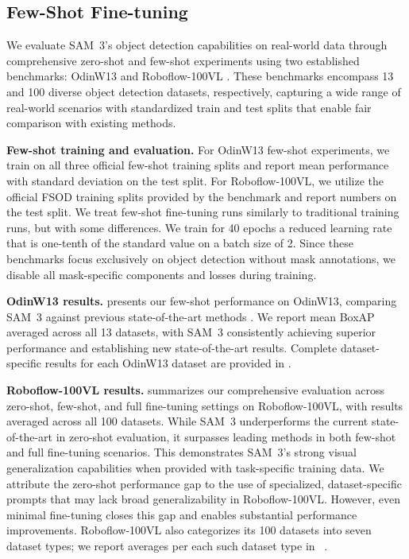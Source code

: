 \documentclass[]{fairmeta}
\newcommand{\model}{SAM~3\xspace}
\begin{document}
	
	
	
	
	\subsection{Few-Shot Fine-tuning}
	\label{app:fewshots}
	
	We evaluate \model's object detection capabilities on real-world data through comprehensive zero-shot and few-shot experiments using two established benchmarks: OdinW13 \cite{odinw} and Roboflow-100VL \cite{robicheaux2025roboflow100vl}. These benchmarks encompass 13 and 100 diverse object detection datasets, respectively, capturing a wide range of real-world scenarios with standardized train and test splits that enable fair comparison with existing methods.
	
	\textbf{Few-shot training and evaluation.} For OdinW13 few-shot experiments, we train on all three official few-shot training splits and report mean performance with standard deviation on the test split. For Roboflow-100VL, we utilize the official FSOD training splits provided by the benchmark and report numbers on the test split. We treat few-shot fine-tuning runs similarly to traditional training runs, but with some differences. We train for 40 epochs a reduced learning rate that is one-tenth of the standard value on a batch size of 2. Since these benchmarks focus exclusively on object detection without mask annotations, we disable all mask-specific components and losses during training.
	
	\textbf{OdinW13 results.}  presents our few-shot performance on OdinW13, comparing \model against previous state-of-the-art methods \cite{ren2024grounding, wu2023GLEE, xu2023multi, zhang2022glipv2}. We report mean BoxAP averaged across all 13 datasets, with \model consistently achieving superior performance and establishing new state-of-the-art results. Complete dataset-specific results for each OdinW13 dataset are provided in .
	
	\textbf{Roboflow-100VL results.}  summarizes our comprehensive evaluation across zero-shot, few-shot, and full fine-tuning settings on Roboflow-100VL, with results averaged across all 100 datasets. While \model underperforms the current state-of-the-art \cite{Liu2023GroundingDM} in zero-shot evaluation, it surpasses leading methods \cite{Liu2023GroundingDM, chen2024lw} in both few-shot and full fine-tuning scenarios. This demonstrates \model's strong visual generalization capabilities when provided with task-specific training data. We attribute the zero-shot performance gap to the use of specialized, dataset-specific prompts that may lack broad generalizability in Roboflow-100VL. However, even minimal fine-tuning closes this gap and enables substantial performance improvements. Roboflow-100VL also categorizes its 100 datasets into seven dataset types; we report averages per each such dataset type in ~.
	
\end{document}
